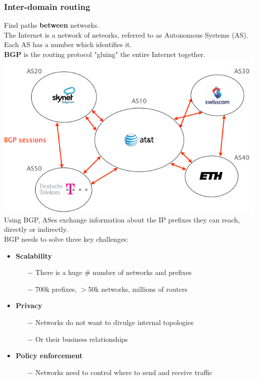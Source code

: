 \documentclass[a4paper, fontsize=8pt, landscape, DIV=1]{scrartcl}
\begin{document}
\begin{multicols*}{4}
		\subsubsection{Inter-domain routing}
		Find paths \textbf{between} networks.\\
		The Internet is a network of neteorks, referred to as Autonomous Systems
		(AS). Each AS has a number which identifies it. \\
		\textbf{BGP} is the routing protocol "gluing" the entire Internet together.
		\includegraphics[width=\columnwidth]{images/Network_Layer/BGP_gluing.png}
		Using BGP, ASes exchange information about the IP prefixes they can reach,
		directly or indirectly. \\
		BGP needs to solve three key challenges:
		\begin{itemize}[noitemsep]
			\item \textbf{Scalability}
			\begin{itemize}
				\item[$-$] There is a huge \# number of networks and prefixes
				\item[$-$] 700k prefixes, $>$50k networks, millions of routers 
			\end{itemize}
			\item \textbf{Privacy}
			\begin{itemize}
				\item[$-$] Networks do not want to divulge internal topologies
				\item[$-$] Or their business relationships
			\end{itemize}
			\item \textbf{Policy enforcement}
			\begin{itemize}
				\item[$-$] Networks need to control where to send and receive traffic

\end{itemize}
\end{itemize}
\end{multicols*}
\end{document}
